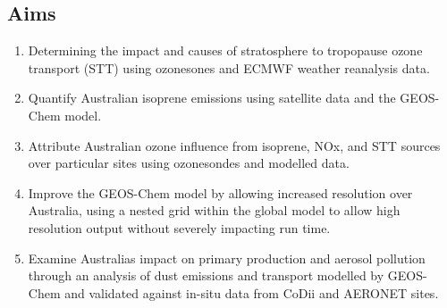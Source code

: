 
\subsection{Aims}
\begin{enumerate}
\item Determining the impact and causes of stratosphere to tropopause ozone transport (STT) using ozonesones and ECMWF weather reanalysis data.
\item Quantify Australian isoprene emissions using satellite data and the GEOS-Chem model. 
\item Attribute Australian ozone influence from isoprene, NOx, and STT sources over particular sites using ozonesondes and modelled data.
\item Improve the GEOS-Chem model by allowing increased resolution over Australia, using a nested grid within the global model to allow high resolution output without severely impacting run time.
\item Examine Australias impact on primary production and aerosol pollution through an analysis of dust emissions and transport modelled by GEOS-Chem and validated against in-situ data from CoDii and AERONET sites.
\end{enumerate}